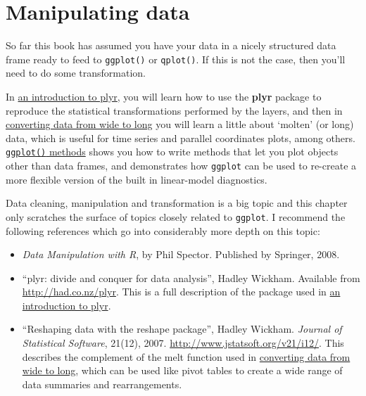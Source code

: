 \chapter{Manipulating data}\label{cha:data}

So far this book has assumed you have your data in a nicely structured
data frame ready to feed to \texttt{ggplot()} or \texttt{qplot()}. If
this is not the case, then you'll need to do some transformation.

In \hyperref[sec:plyr]{an introduction to plyr}, you will learn how to
use the \textbf{plyr} package to reproduce the statistical
transformations performed by the layers, and then in
\hyperref[sec:melting]{converting data from wide to long} you will learn
a little about `molten' (or long) data, which is useful for time series
and parallel coordinates plots, among others.
\hyperref[sec:methods]{\texttt{ggplot()} methods} shows you how to write
methods that let you plot objects other than data frames, and
demonstrates how \texttt{ggplot} can be used to re-create a more
flexible version of the built in linear-model diagnostics.

Data cleaning, manipulation and transformation is a big topic and this
chapter only scratches the surface of topics closely related to
\texttt{ggplot}. I recommend the following references which go into
considerably more depth on this topic:

\begin{itemize}
\itemsep1pt\parskip0pt
\item
  \emph{Data Manipulation with R}, by Phil Spector. Published by
  Springer, 2008.
\item
  ``plyr: divide and conquer for data analysis'', Hadley Wickham.
  Available from \url{http://had.co.nz/plyr}. This is a full description
  of the package used in \hyperref[sec:plyr]{an introduction to plyr}.
\item
  ``Reshaping data with the reshape package'', Hadley Wickham.
  \emph{Journal of Statistical Software}, 21(12), 2007.
  \url{http://www.jstatsoft.org/v21/i12/}. This describes the complement
  of the melt function used in \hyperref[sec:melting]{converting data
  from wide to long}, which can be used like pivot tables to create a
  wide range of data summaries and rearrangements.
\end{itemize}


